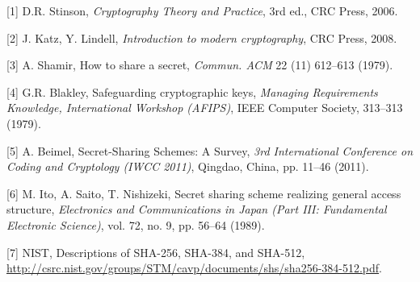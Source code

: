 [1] D.R. Stinson, \textit{Cryptography Theory and Practice}, 3rd ed., CRC Press, 2006.

[2] J. Katz, Y. Lindell, \textit{Introduction to modern cryptography}, CRC Press, 2008.

[3] A. Shamir, How to share a secret, \textit{Commun. ACM} 22 (11) 612–613 (1979).

[4] G.R. Blakley, Safeguarding cryptographic keys, \textit{Managing Requirements Knowledge, International Workshop (AFIPS)}, IEEE Computer Society, 313–313 (1979).

[5] A. Beimel, Secret-Sharing Schemes: A Survey, \textit{3rd International Conference on Coding and Cryptology (IWCC 2011)}, Qingdao, China, pp. 11–46 (2011).

[6] M. Ito, A. Saito, T. Nishizeki, Secret sharing scheme realizing general access structure, \textit{Electronics and Communications in Japan (Part III: Fundamental Electronic Science)}, vol. 72, no. 9, pp. 56–64 (1989).

[7] NIST, Descriptions of SHA-256, SHA-384, and SHA-512, \url{http://csrc.nist.gov/groups/STM/cavp/documents/shs/sha256-384-512.pdf}.

